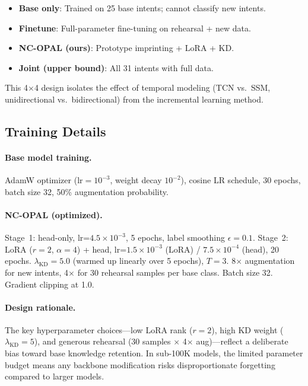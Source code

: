 \documentclass[11pt]{article}
\begin{document}
\begin{itemize}
\setlength\itemsep{0pt}
\item \textbf{Base only}: Trained on 25 base intents; cannot classify new intents.
\item \textbf{Finetune}: Full-parameter fine-tuning on rehearsal + new data.
\item \textbf{NC-OPAL (ours)}: Prototype imprinting + LoRA + KD.
\item \textbf{Joint (upper bound)}: All 31 intents with full data.
\end{itemize}

This 4$\times$4 design isolates the effect of temporal modeling (TCN vs.\ SSM, unidirectional vs.\ bidirectional) from the incremental learning method.

\subsection{Training Details}

\paragraph{Base model training.}
AdamW optimizer \cite{loshchilov2019adamw} ($\text{lr}=10^{-3}$, weight decay $10^{-2}$), cosine LR schedule, 30 epochs, batch size 32, 50\% augmentation probability.

\paragraph{NC-OPAL (optimized).}
Stage~1: head-only, lr=$4.5 \times 10^{-3}$, 5 epochs, label smoothing $\epsilon=0.1$.
Stage~2: LoRA ($r=2$, $\alpha=4$) + head, lr=$1.5 \times 10^{-3}$ (LoRA) / $7.5 \times 10^{-4}$ (head), 20 epochs.
$\lambda_{\text{KD}}=5.0$ (warmed up linearly over 5 epochs), $T=3$.
8$\times$ augmentation for new intents, 4$\times$ for 30 rehearsal samples per base class.
Batch size 32. Gradient clipping at 1.0.

\paragraph{Design rationale.}
The key hyperparameter choices---low LoRA rank ($r{=}2$), high KD weight ($\lambda_{\text{KD}}{=}5$), and generous rehearsal (30 samples $\times$ 4$\times$ aug)---reflect a deliberate bias toward base knowledge retention.
In sub-100K models, the limited parameter budget means any backbone modification risks disproportionate forgetting compared to larger models.
\end{document}
